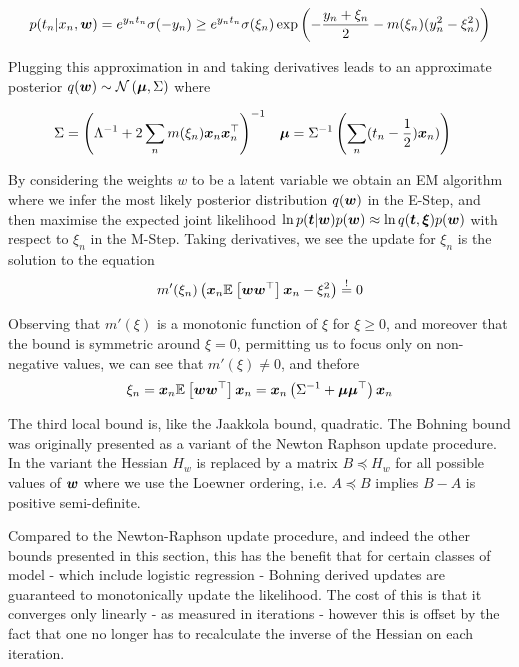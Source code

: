 \begin{equation}
p(t_n | x_n, \bm w) = e^{y_n t_n}\sigma(-y_n) \geq e^{y_n t_n} \sigma(\xi_n) \exp\left( -\frac{y_n + \xi_n}{2} - m(\xi_n)(y_n^2 - \xi_n^2)\right)
\end{equation}

Plugging this approximation in and taking derivatives leads to an approximate posterior $q(\bm w) \sim \mathcal{N} \left( {\bm \mu}, {\Sigma} \right)$ where

\begin{align}
\Sigma & = {\left( {\Lambda}^{-1} + 2 \sum_n m(\xi_n)\bm x_n\bm x_n^\top \right)}^{-1} & \bm \mu & = {\Sigma}^{-1} \left(\sum_n (t_n - \frac{1}{2}) \bm x_n)\right)
\end{align}

By considering the weights $w$ to be a latent variable we obtain an EM algorithm where we infer the most likely posterior distribution $q(\bm w)$ in the E-Step, and then maximise the expected joint likelihood $\ln p(\bm t| \bm w)p(\bm w) \approx \ln q(\bm t, \bm \xi)p(\bm w)$  with respect to $\xi_n$ in the M-Step. Taking derivatives, we see the update for $\xi_n$ is the solution to the equation
\begin{align}
m'(\xi_n) \left( \bm x_n \mathbb{E}_{ {  } }\left[ \bm w\bm w^\top \right]\bm x_n - \xi^2_n \right) \overset{!}{=} 0
\end{align}

Observing that $m'(\xi)$ is a monotonic function of $\xi$ for $\xi \geq 0$, and moreover that the bound is symmetric around $\xi = 0$, permitting us to focus only on non-negative values, we can see that $m'(\xi) \neq 0$, and thefore
\begin{align}
\xi_n = \bm x_n \mathbb{E}_{ {  } }\left[ \bm w \bm w^\top  \right] \bm x_n = \bm x_n \left( {\Sigma}^{-1} + \bm \mu \bm \mu^\top \right) \bm x_n
\end{align}

The third local bound is, like the Jaakkola bound, quadratic. The Bohning bound  was originally presented \cite{Bohning1988a} as a variant of the Newton Raphson update procedure. In the variant the Hessian $H_w$ is replaced by a matrix $B \preceq H_w$ for all possible values of $\bm w$ where we use the Loewner ordering, i.e. $A \preceq B$ implies $B - A$ is positive semi-definite.

Compared to the Newton-Raphson update procedure, and indeed the other bounds presented in this section, this has the benefit that for certain classes of model - which include logistic regression - Bohning derived updates are guaranteed to monotonically update the likelihood. The cost of this is that it converges only linearly - as measured in iterations - however this is offset by the fact that one no longer has to recalculate the inverse of the Hessian on each iteration.

